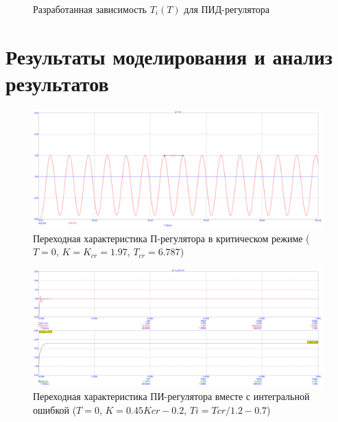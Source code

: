 \begin{figure}[H]
	\centering
	\caption{Разработанная зависимость $T_i(T)$ для ПИД-регулятора}
\end{figure}

\newpage

\section{Результаты моделирования и анализ результатов}
\begin{figure}[H]
	\centering
	\includegraphics[scale=0.35]{./screens/plots/p_plot.png}
	\caption{Переходная характеристика П-регулятора в критическом режиме ($T = 0$, $K=K_{cr}=1.97$, $T_{cr}=6.787$)} 
\end{figure}

\begin{figure}[H]
	\centering
	\includegraphics[scale=0.35]{./screens/plots/pi_plot_error.png}
	\caption{Переходная характеристика ПИ-регулятора вместе с интегральной ошибкой ($T = 0$, $K = 0.45Kcr - 0.2$, $Ti = Tcr / 1.2 - 0.7$)} 
\end{figure}

